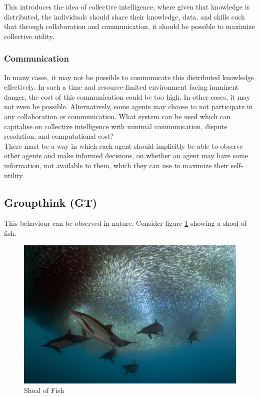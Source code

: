 This introduces the idea of collective intelligence, where given that knowledge is distributed, the  individuals should share their knowledge, data, and skills such that through collaboration and communication, it should be possible to maximize collective utility.

\subsubsection{Communication}
In many cases, it may not be possible to communicate this distributed knowledge effectively. In such a time and resource-limited environment facing imminent danger, the cost of this communication could be too high. In other cases, it may not even be possible. Alternatively, some agents may choose to not participate in any collaboration or communication.  What system can be used which can capitalise on collective intelligence with minimal communication, dispute resolution, and computational cost? \\ 

There must be a way in which each agent should implicitly be able to observe other agents and make informed decisions, on whether an agent may have some information, not available to them, which they can use to maximize their self-utility.

\subsection{Groupthink (GT)}
This behaviour can be observed in nature. Consider figure \ref{fig:T6Fish} showing a shoal of fish. \\

\begin{figure}[h]           %
	\centering				%
	\includegraphics[scale = 0.1]{009_team_6_agent_design/fish.jpg}			%
    \caption{Shoal of Fish}
	\label{fig:T6Fish}			%
\end{figure}

